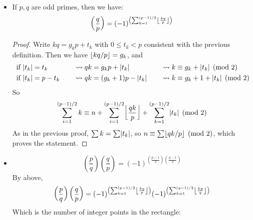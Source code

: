 \begin{prop}
\begin{itemize}
\begin{proof}
\[\begin{cases}
            p - t_j & \text{ If } p/2 < t_j < p \quad (t_j \equiv -\abs{t_j})
        \end{cases} \]
      Notice that $\abs{t_i}$ takes value between $1$ and $(p-1)/2$,
      and $\abs{ra} \equiv \abs{sa} \pmod{p} \implies
      ra \equiv \pm sa \pmod{p} \implies r \equiv \pm s \pmod{p}$ since $\gcd(a, p) = 1$.
      So $\abs{t_k}$ would have distinct value for $1 \leq k \leq (p-1)/2$.
      Thus
      \[ \prod t_k \equiv \frac{p-1}{2}! a^{(p-1)/2} \equiv (-1)^n \frac{p-1}{2}!
        \implies a^{(p-1)/2} \equiv (-1)^n \]
      \end{proof}
    \item If $p, q$ are odd primes, then we have:
      \[ \left( \frac{q}{p} \right) = (-1)^{\left( \sum_{k=1}^{(p-1)/2} \floor*{\frac{kq}{p}} \right)} \]
      \begin{proof}
        Write $kq = g_k p + t_k$ with $0 \leq t_k < p$ consistent with the previous definition.
        Then we have $\floor{kq / p} = g_k$, and
        \begin{alignat*}{4}
          & \text{ if } \abs{t_k} = t_k && \leadsto qk = g_k p + \abs{t_k} &&
          \leadsto k \equiv g_k + \abs{t_k} \pmod{2} \\
          & \text{ if } \abs{t_k} = p - t_k \quad && \leadsto qk = (g_k+1) p - \abs{t_k} \quad &&
          \leadsto k \equiv g_k + 1 + \abs{t_k} \pmod{2} \\
        \end{alignat*}
        So
        \[ \sum_{i = 1}^{(p-1)/2} k \equiv n + \sum_{i=1}^{(p-1)/2} \floor*{\frac{qk}{p}}
          + \sum_{k=1}^{(p-1)/2} \abs{t_k} \pmod{2} \]
        As in the previous proof, $\sum k = \sum \abs{t_k}$, so $n \equiv \sum \floor{qk/p} \pmod{2}$,
        which proves the statement.
      \end{proof}
    \item
      \[ \left( \frac{p}{q} \right) \left( \frac{q}{p} \right)
        = (-1)^{\left(\frac{p-1}{2}\right) \left(\frac{q-1}{2}\right)} \]
      By above,
      \[ \left( \frac{p}{q} \right) \left( \frac{q}{p} \right)
        = (-1)^{\left( \sum_{k=1}^{(p-1)/2} \floor*{\frac{kq}{p}} \right)}
        (-1)^{\left( \sum_{k=1}^{(q-1)/2} \floor*{\frac{kp}{q}} \right)} 
      \]
      Which is the number of integer points in the rectangle:
      \begin{figure}[H]
        \centering
\end{figure}
\end{itemize}
\end{prop}
